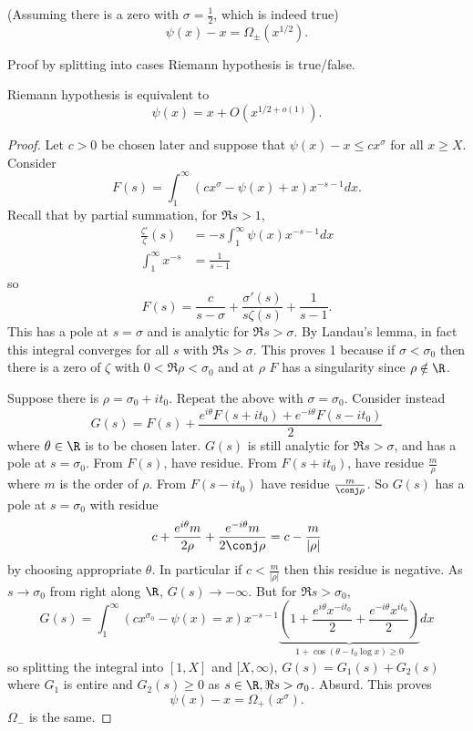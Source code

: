 \documentclass[a4paper]{article}
\theoremstyle{definition}
\begin{document}
\begin{corollary}
  (Assuming there is a zero with \(\sigma = \frac{1}{2}\), which is indeed true)
  \[
    \psi(x) - x = \Omega_\pm (x^{1/2}).
  \]
\end{corollary}
Proof by splitting into cases Riemann hypothesis is true/false.

\begin{corollary}
  \label{cor:RH equivalent to bound on PNT}
  Riemann hypothesis is equivalent to
  \[
    \psi(x) = x + O(x^{1/2 + o(1)}).
  \]
\end{corollary}

\begin{proof}
  Let \(c > 0\) be chosen later and suppose that \(\psi(x) - x \leq c x^\sigma\) for all \(x \geq X\). Consider
  \[
    F(s) = \int_1^\infty (cx^\sigma - \psi(x) + x) x^{-s - 1} dx.
  \]
  Recall that by partial summation, for \(\Re s > 1\),
  \begin{align*}
    \frac{\zeta'}{\zeta}(s) &= -s \int_1^\infty \psi(x) x^{-s - 1} dx \\
    \int_1^\infty x^{-s} &= \frac{1}{s - 1}
  \end{align*}
  so
  \[
    F(s) = \frac{c}{s - \sigma} + \frac{\sigma'(s)}{s \zeta(s)} + \frac{1}{s - 1}.
  \]
  This has a pole at \(s = \sigma\) and is analytic for \(\Re s > \sigma\). By Landau's lemma, in fact this integral converges for all \(s\) with \(\Re s > \sigma\). This proves 1 because if \(\sigma < \sigma_0\) then there is a zero of \(\zeta\) with \(0 < \Re \rho < \sigma_0\) and at \(\rho\) \(F\) has a singularity since \(\rho \notin \R\).

  Suppose there is \(\rho = \sigma_0 + it_0\). Repeat the above with \(\sigma = \sigma_0\). Consider instead
  \[
    G(s) = F(s) + \frac{e^{i\theta} F(s + it_0) + e^{-i\theta} F(s - it_0)}{2}
  \]
  where \(\theta \in \R\) is to be chosen later. \(G(s)\) is still analytic for \(\Re s > \sigma\), and has a pole at \(s = \sigma_0\). From \(F(s)\), have residue. From \(F(s + it_0)\), have residue \(\frac{m}{\rho}\) where \(m\) is the order of \(\rho\). From \(F(s - it_0)\) have residue \(\frac{m}{\conj \rho}\). So \(G(s)\) has a pole at \(s = \sigma_0\) with residue
  \[
    c + \frac{e^{i\theta} m}{2 \rho} + \frac{e^{-i\theta}m}{2 \conj \rho} = c - \frac{m}{|\rho|}
  \]
  by choosing appropriate \(\theta\). In particular if \(c < \frac{m}{|\rho|}\) then this residue is negative. As \(s \to \sigma_0\) from right along \(\R\), \(G(s) \to - \infty\). But for \(\Re s > \sigma_0\),
  \[
    G(s) = \int_1^\infty (c x^{\sigma_0} - \psi(x) = x) x^{-s - 1} \underbrace{(1 + \frac{e^{i\theta} x^{-it_0}}{2} +  \frac{e^{-i\theta} x^{it_0}}{2})}_{1 + \cos (\theta - t_0 \log x) \geq 0} dx
  \]
  so splitting the integral into \([1, X]\) and \([X, \infty)\), \(G(s) = G_1(s) + G_2(s)\) where \(G_1\) is entire and \(G_2(s) \geq 0\) as \(s \in \R, \Re s > \sigma_0\). Absurd. This proves
  \[
    \psi(x) - x = \Omega_+(x^\sigma).
  \]
  \(\Omega_-\) is the same.
\end{proof}
\end{document}
